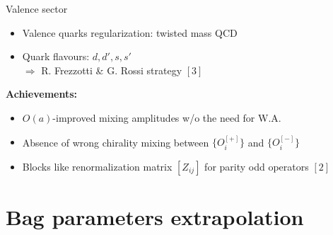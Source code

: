 \documentclass{beamer}
\begin{document}
\begin{frame}{Valence sector}
      \begin{itemize}
            \item Valence quarks regularization: twisted mass QCD
            \item Quark flavours: $d,d',s,s'$
            \\ $\Longrightarrow$ R. Frezzotti \& G. Rossi strategy $[3]$
      \end{itemize}
      \vspace{\baselineskip}
      {\bf Achievements:}
      \begin{itemize}%
            \item $O(a)$-improved mixing amplitudes w/o the need for W.A.
            \item Absence of wrong chirality mixing between $\{O_i^{[+]}\}$ and $\{O_i^{[-]}\}$
            \item Blocks like renormalization matrix $[Z_{ij}]$ for parity odd operators $[2]$
      \end{itemize}
\end{frame}

\section{Bag parameters extrapolation}
\end{document}
